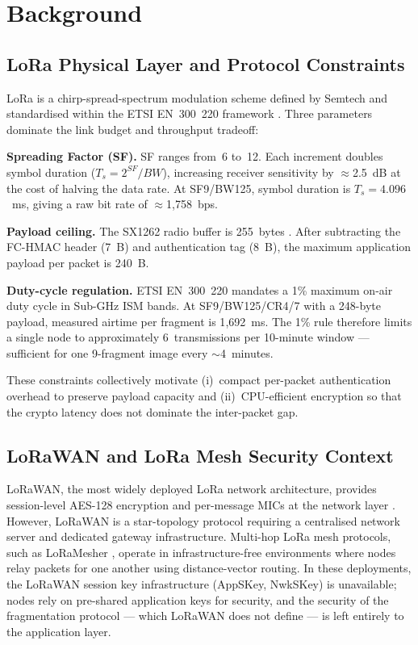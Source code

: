 \documentclass[journal]{IEEEtran}
\begin{document}
\section{Background}
\label{sec:background}

\subsection{LoRa Physical Layer and Protocol Constraints}

LoRa is a chirp-spread-spectrum modulation scheme defined by Semtech and
standardised within the ETSI EN~300~220 framework \cite{etsi_en300220}.  Three
parameters dominate the link budget and throughput tradeoff:

\textbf{Spreading Factor (SF).}  SF ranges from~6 to~12.  Each increment
doubles symbol duration ($T_s = 2^{SF}/BW$), increasing receiver sensitivity by
$\approx$2.5~dB at the cost of halving the data rate.  At SF9/BW125, symbol
duration is $T_s = 4.096$~ms, giving a raw bit rate of $\approx$1{,}758~bps.

\textbf{Payload ceiling.}  The SX1262 radio buffer is 255~bytes
\cite{semtech_sx1262}.  After subtracting the FC-HMAC header (7~B) and
authentication tag (8~B), the maximum application payload per packet is 240~B.

\textbf{Duty-cycle regulation.}  ETSI EN~300~220 mandates a 1\% maximum
on-air duty cycle in Sub-GHz ISM bands.  At SF9/BW125/CR4/7 with a 248-byte
payload, measured airtime per fragment is 1{,}692~ms.  The 1\% rule therefore
limits a single node to approximately 6~transmissions per 10-minute window ---
sufficient for one 9-fragment image every $\sim$4~minutes.

These constraints collectively motivate (i)~compact per-packet authentication
overhead to preserve payload capacity and (ii)~CPU-efficient encryption so that
the crypto latency does not dominate the inter-packet gap.

\subsection{LoRaWAN and LoRa Mesh Security Context}

LoRaWAN, the most widely deployed LoRa network architecture, provides
session-level AES-128 encryption and per-message MICs at the network
layer \cite{etsi_en300220}.  However, LoRaWAN is a star-topology protocol
requiring a centralised network server and dedicated gateway infrastructure.
Multi-hop LoRa mesh protocols, such as LoRaMesher \cite{loramesh_github},
operate in infrastructure-free environments where nodes relay packets for
one another using distance-vector routing.  In these deployments, the LoRaWAN
session key infrastructure (AppSKey, NwkSKey) is unavailable; nodes rely on
pre-shared application keys for security, and the security of the fragmentation
protocol --- which LoRaWAN does not define --- is left entirely to the
application layer.
\end{document}
